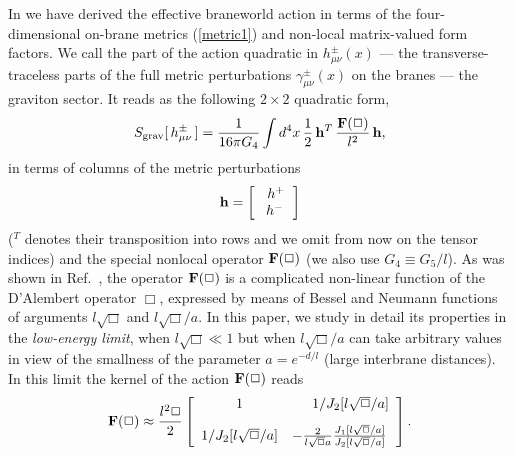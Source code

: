\documentclass[a4paper,prl,twocolumn,amsmath,amssymb,showpacs]{revtex4}
\begin{document}
 
In \cite{we} we have derived the effective braneworld action in 
terms of the four-dimensional on-brane metrics (\ref{metric1})  
and non-local matrix-valued form 
factors. We call the part of the action quadratic in $h^\pm_{\mu\nu}(x)$ --- 
the transverse-traceless parts of the full metric perturbations  
$\gamma_{\mu\nu}^\pm(x)$ on the branes --- the graviton sector.  
It reads as the following $2\times2$ quadratic form, 
    \begin{equation}  
    S_{\rm grav}[\,h^\pm_{\mu\nu}\,]  
    =\frac1{16\pi G_4}\int  
    d^4x\,\frac12\,  
    {\bf h}^T  
    \,\frac{{\bf  F}(\Box)}{l^2}\,  
    {\bf h},        \label{4.24}  
    \end{equation} 
in terms of columns of the metric perturbations  
    \begin{equation}  
    {\bf h}=  
    \left[\begin{array}{c}  
    \,\,h^+ \\  
    \,\,h^-\,  
    \end{array}\right]       
\end{equation} 
(${}^T$ denotes their transposition into rows and we omit from now on the
tensor indices) and the special nonlocal operator ${\bf F}(\Box)$ (we also use
$G_4 \equiv G_5/l$). As was shown in Ref.\ \cite{we}, the operator ${\bf
  F}(\Box)$ is a complicated non-linear function of the D'Alembert operator
$\Box$, expressed by means of Bessel and Neumann functions of arguments $l
\sqrt{\Box}$ and $l\sqrt{\Box}/a$. In this paper, we study in detail its
properties in the \emph{low-energy limit}, when $l \sqrt{\Box} \ll 1$ but when
$l \sqrt{\Box}/a$ can take arbitrary values in view of the smallness of the
parameter $a=e^{-d/l}$ (large interbrane distances).  In this limit the kernel
of the action ${\bf F}(\Box)$ reads
    \begin{equation}  
    {\bf F}(\Box) \approx \frac{l^2\Box}{2} 
    \left[\begin{array}{cr}  
    1   
    &1/J_2[l\sqrt\Box/a]\\[3mm]   
    1/J_2[l\sqrt\Box/a]&  
    -\frac 2{l\sqrt{\Box} a}  
    \frac{J_1[l\sqrt\Box/a]}{J_2[l\sqrt\Box/a]}\,  
    \end{array}\right].      \label{7.4.3}  
    \end{equation} 
  
\end{document}
